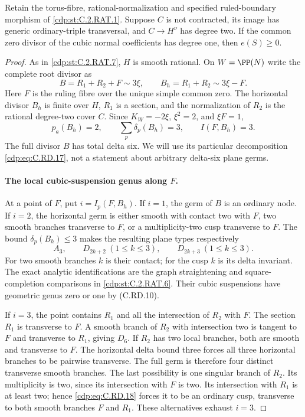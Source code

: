 
\begin{proposition}\label{cdp:st:C.2.RAT.8}
Retain the torus-fibre, rational-normalization and specified
ruled-boundary morphism of \ref{cdp:st:C.2.RAT.1}. Suppose $C$ is not
contracted, its image has generic ordinary-triple transversal,
and $C\to H^\nu$ has degree two. If the common zero divisor
of the cubic normal coefficients has degree one, then
$e(S)\ge0$.
\end{proposition}
\begin{proof}
As in \ref{cdp:st:C.2.RAT.7}, $H$ is smooth rational. On $W=\PP(N)$
write the complete root divisor as
\[
 B=R_1+R_2+F\sim3\xi,
 \qquad B_h=R_1+R_2\sim3\xi-F.
\tag{C.RD.17}\label{cdp:eq:C.RD.17}
\]
Here $F$ is the ruling fibre over the unique simple
common zero. The horizontal divisor $B_h$ is finite
over $H$, $R_1$ is a section, and the normalization of
$R_2$ is the rational degree-two cover $C$.
Since $K_W=-2\xi$, $\xi^2=2$, and $\xi F=1$,
\[
 p_a(B_h)=2,
 \qquad \sum_p\delta_p(B_h)=3,
 \qquad I(F,B_h)=3.
\tag{C.RD.18}\label{cdp:eq:C.RD.18}
\]
The full divisor $B$ has total delta six. We will
use its particular decomposition \eqref{cdp:eq:C.RD.17}, not a
statement about arbitrary delta-six plane germs.

\paragraph{The local cubic-suspension genus along $F$.}
At a point of $F$, put $i=I_p(F,B_h)$. If $i=1$,
the germ of $B$ is an ordinary node. If $i=2$,
the horizontal germ is either smooth with contact
two with $F$, two smooth branches transverse to
$F$, or a multiplicity-two cusp transverse to $F$.
The bound $\delta_p(B_h)\le3$ makes the resulting
plane types respectively
\[
 A_3,\qquad D_{2k+2}\ (1\le k\le3),\qquad
                 D_{2k+3}\ (1\le k\le3).
\tag{C.RD.19}\label{cdp:eq:C.RD.19}
\]
For two smooth branches $k$ is their contact;
for the cusp $k$ is its delta invariant.
The exact analytic identifications are the graph
straightening and square-completion comparisons
in \ref{cdp:st:C.2.RAT.6}. Their cubic suspensions have
geometric genus zero or one by (C.RD.10).

If $i=3$, the point contains $R_1$ and all the
intersection of $R_2$ with $F$. The section $R_1$
is transverse to $F$. A smooth branch of $R_2$
with intersection two is tangent to $F$ and
transverse to $R_1$, giving $D_6$. If $R_2$ has
two local branches, both are smooth and transverse
to $F$. The horizontal delta bound three forces
all three horizontal branches to be pairwise
transverse. The full germ is therefore four
distinct transverse smooth branches.
The last possibility is one singular branch
of $R_2$. Its multiplicity is two, since its
intersection with $F$ is two. Its intersection
with $R_1$ is at least two; hence \eqref{cdp:eq:C.RD.18}
forces it to be an ordinary cusp, transverse
to both smooth branches $F$ and $R_1$.
These alternatives exhaust $i=3$.


\end{proof}
